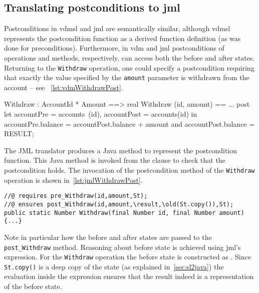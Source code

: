 \subsection{Translating postconditions to \ac{jml}}
\label{sec:postcond}

Postconditions in \ac{vdmsl} and \ac{jml} are semantically similar,
although \ac{vdmsl} represents the postcondition function as a derived
function definition (as was done for preconditions). Furthermore, in
\ac{vdm} and \ac{jml} postconditions of operations and methods,
respectively, can access both the before and after states. Returning
to the \texttt{Withdraw} operation, one could specify a postcondition
requiring that exactly the value specified by the \texttt{amount}
parameter is withdrawn from the account -- see
~\autoref{lst:vdmWithdrawPost}.

\begin{vdmsl}[style=customVdm,caption={The \texttt{Withdraw} operation
guarded by a postcondition.},label={lst:vdmWithdrawPost}]
Withdraw : AccountId * Amount ==> real
Withdraw (id, amount) == ...
post
let accountPre = accounts~(id),
    accountPost = accounts(id)
in
 accountPre.balance =
 accountPost.balance + amount and
 accountPost.balance = RESULT;
\end{vdmsl}

The JML translator produces a  Java method to represent the
postcondition function. This Java method is invoked from the
 clause to check that the postcondition holds. The
invocation of the postcondition method of the \texttt{Withdraw}
operation is shown in~\autoref{lst:jmlWithdrawPost}.

\begin{lstlisting}[style=customJml,caption={Code-generated version of
the \texttt{Withdraw} operation.},label={lst:jmlWithdrawPost}]
//@ requires pre_Withdraw(id,amount,St);
//@ ensures post_Withdraw(id,amount,\result,\old(St.copy()),St);
public static Number Withdraw(final Number id, final Number amount) {...}
\end{lstlisting}

Note in particular how the before and after states are passed to the
\texttt{post\_Withdraw} method. Reasoning about before state is
achieved using \ac{jml}'s \old expression. For the \texttt{Withdraw}
operation the before state is constructed as . Since
\texttt{St.copy()} is a deep copy of the state (as explained
in~\autoref{sec:sl2java}) the evaluation inside the \old expression
ensures that the result indeed is a representation of the before
state.


